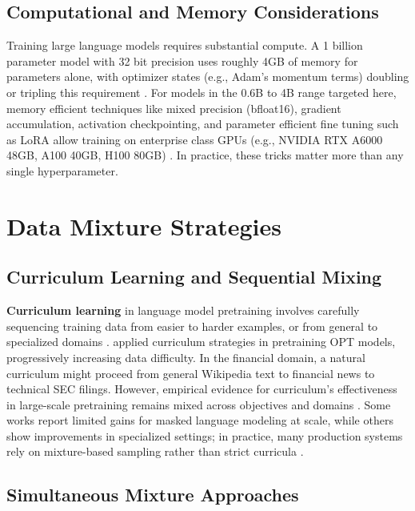 \subsection{Computational and Memory Considerations}

Training large language models requires substantial compute. A 1 billion parameter model with 32 bit precision uses roughly 4GB of memory for parameters alone, with optimizer states (e.g., Adam's momentum terms) doubling or tripling this requirement \parencite{rajbhandari2020zero,kingma2014adam}. For models in the 0.6B to 4B range targeted here, memory efficient techniques like mixed precision (bfloat16), gradient accumulation, activation checkpointing, and parameter efficient fine tuning such as LoRA allow training on enterprise class GPUs (e.g., NVIDIA RTX A6000 48GB, A100 40GB, H100 80GB) \parencite{narayanan2021efficient,hu2021lora}. In practice, these tricks matter more than any single hyperparameter.

\section{Data Mixture Strategies}

\subsection{Curriculum Learning and Sequential Mixing}

\textbf{Curriculum learning} in language model pretraining involves carefully sequencing training data from easier to harder examples, or from general to specialized domains \parencite{bengio2009curriculum}. \textcite{wu2022opt} applied curriculum strategies in pretraining OPT models, progressively increasing data difficulty. In the financial domain, a natural curriculum might proceed from general Wikipedia text to financial news to technical SEC filings. However, empirical evidence for curriculum's effectiveness in large-scale pretraining remains mixed across objectives and domains \parencite{longpre2023pretrainer}. Some works report limited gains for masked language modeling at scale, while others show improvements in specialized settings; in practice, many production systems rely on mixture-based sampling rather than strict curricula \parencite{raffel2020exploring,wu2022opt}.

\subsection{Simultaneous Mixture Approaches}

